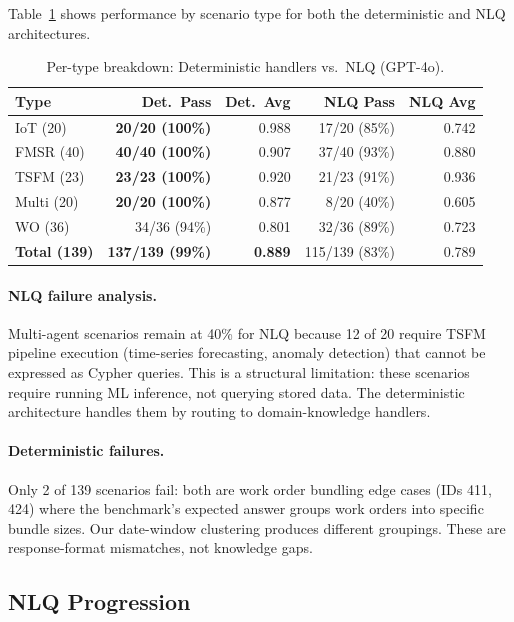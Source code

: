 \documentclass[11pt]{article}
\begin{document}
Table~\ref{tab:per-type} shows performance by scenario type for both the deterministic and NLQ architectures.

\begin{table}[t]
  \centering
  \caption{Per-type breakdown: Deterministic handlers vs.\ NLQ (GPT-4o).}
  \label{tab:per-type}
  \begin{tabular}{@{}lrrrr@{}}
    \toprule
    \textbf{Type} & \textbf{Det.\ Pass} & \textbf{Det.\ Avg} & \textbf{NLQ Pass} & \textbf{NLQ Avg} \\
    \midrule
    IoT (20)    & \textbf{20/20 (100\%)} & 0.988 & 17/20 (85\%)  & 0.742 \\
    FMSR (40)   & \textbf{40/40 (100\%)} & 0.907 & 37/40 (93\%)  & 0.880 \\
    TSFM (23)   & \textbf{23/23 (100\%)} & 0.920 & 21/23 (91\%)  & 0.936 \\
    Multi (20)  & \textbf{20/20 (100\%)} & 0.877 & 8/20 (40\%)   & 0.605 \\
    WO (36)     & 34/36 (94\%)           & 0.801 & 32/36 (89\%)  & 0.723 \\
    \midrule
    \textbf{Total (139)} & \textbf{137/139 (99\%)} & \textbf{0.889} & 115/139 (83\%) & 0.789 \\
    \bottomrule
  \end{tabular}
\end{table}

\paragraph{NLQ failure analysis.} Multi-agent scenarios remain at 40\% for NLQ because 12 of 20 require TSFM pipeline execution (time-series forecasting, anomaly detection) that cannot be expressed as Cypher queries. This is a structural limitation: these scenarios require running ML inference, not querying stored data. The deterministic architecture handles them by routing to domain-knowledge handlers.

\paragraph{Deterministic failures.} Only 2 of 139 scenarios fail: both are work order bundling edge cases (IDs 411, 424) where the benchmark's expected answer groups work orders into specific bundle sizes. Our date-window clustering produces different groupings. These are response-format mismatches, not knowledge gaps.

\subsection{NLQ Progression}
\end{document}
